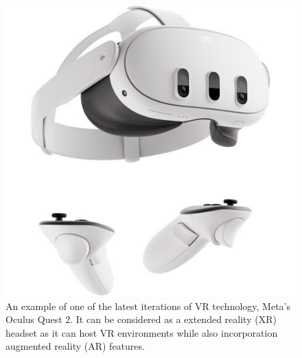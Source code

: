 \begin{figure}
    \centering
    \includegraphics[width=0.6\linewidth]{figures/oculus-quest.jpg}
    \caption{An example of one of the latest iterations of VR technology, Meta's Oculus Quest 2. It can be considered as a extended reality (XR) headset as it can host VR environments while also incorporation augmented reality (AR) features.}
    \label{fig:oculus-quest-2}
\end{figure}

